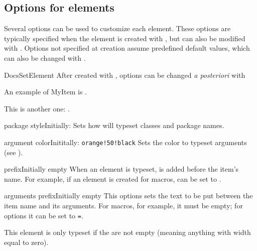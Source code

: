 \documentclass[11pt, outputdir = ./out]{article}
\begin{document}
\subsection{Options for elements}\label{sec:options-for-elements}

Several options can be used to customize each element. These options are typically specified when the element is created with , but can also be modified with . Options not specified at creation assume predefined default values, which can also be changed with .

\begin{Macrodef}{DocsSetElement}{}{}
    After created with , options can be changed \textit{a posteriori} with 
\end{Macrodef}

\begin{example}{}
    An example of MyItem is .\par
    This is another one: .
\end{example}

\begin{Optiondef}{package style}{}{Initially: }
    Sets how  will typeset classes and package names.
\end{Optiondef}

\begin{Optiondef}{argument color}{}{Inititally: \texttt{orange!50!black}}
    Sets the color to typeset arguments (see ).
\end{Optiondef}

\begin{Optiondef}{prefix}{}{Initially empty}
    When an element is typeset,  is added before the item's name. For example, if an element is created for macros,  can be set to .
\end{Optiondef}

\begin{Optiondef}{arguments prefix}{}{Initially empty}
    This options sets the text to be put between the item name and its arguments. For macros, for example, it must be empty; for options it can be set to \texttt{=}.

    This element is only typeset if the  are not empty (meaning anything with width equal to zero).
\end{Optiondef}
\end{document}

